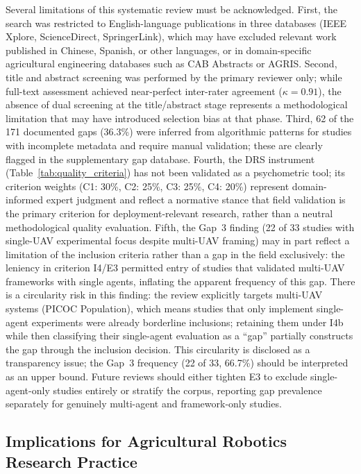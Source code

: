 \documentclass[review,3p,times]{elsarticle}
\begin{document}
Several limitations of this systematic review must be acknowledged. First, the search was restricted to English-language publications in three databases (IEEE Xplore, ScienceDirect, SpringerLink), which may have excluded relevant work published in Chinese, Spanish, or other languages, or in domain-specific agricultural engineering databases such as CAB Abstracts or AGRIS. Second, title and abstract screening was performed by the primary reviewer only; while full-text assessment achieved near-perfect inter-rater agreement ($\kappa=0.91$), the absence of dual screening at the title/abstract stage represents a methodological limitation that may have introduced selection bias at that phase. Third, 62 of the 171 documented gaps (36.3\%) were inferred from algorithmic patterns for studies with incomplete metadata and require manual validation; these are clearly flagged in the supplementary gap database. Fourth, the DRS instrument (Table~\ref{tab:quality_criteria}) has not been validated as a psychometric tool; its criterion weights (C1: 30\%, C2: 25\%, C3: 25\%, C4: 20\%) represent domain-informed expert judgment and reflect a normative stance that field validation is the primary criterion for deployment-relevant research, rather than a neutral methodological quality evaluation. Fifth, the Gap~3 finding (22 of 33 studies with single-UAV experimental focus despite multi-UAV framing) may in part reflect a limitation of the inclusion criteria rather than a gap in the field exclusively: the leniency in criterion I4/E3 permitted entry of studies that validated multi-UAV frameworks with single agents, inflating the apparent frequency of this gap. There is a circularity risk in this finding: the review explicitly targets multi-UAV systems (PICOC Population), which means studies that only implement single-agent experiments were already borderline inclusions; retaining them under I4b while then classifying their single-agent evaluation as a ``gap'' partially constructs the gap through the inclusion decision. This circularity is disclosed as a transparency issue; the Gap~3 frequency (22 of 33, 66.7\%) should be interpreted as an upper bound. Future reviews should either tighten E3 to exclude single-agent-only studies entirely or stratify the corpus, reporting gap prevalence separately for genuinely multi-agent and framework-only studies.

\subsection{Implications for Agricultural Robotics Research Practice}
\label{sec:implications}
\end{document}
